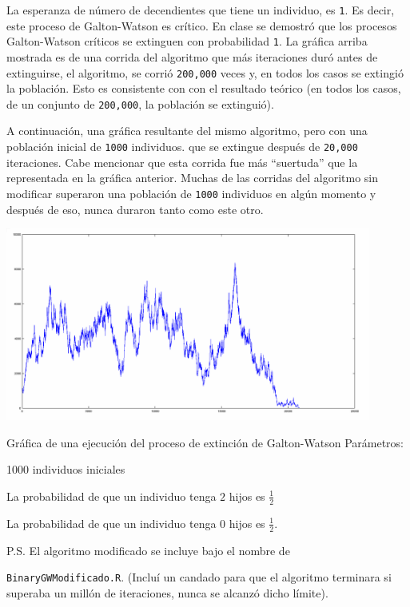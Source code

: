 La esperanza de número de decendientes que tiene un individuo, es \texttt{1}. Es decir,
este proceso de Galton-Watson es crítico. En clase se demostró que los procesos Galton-Watson
críticos se extinguen con probabilidad \texttt{1}. La gráfica arriba mostrada es de una corrida
del algoritmo que más iteraciones duró antes de extinguirse, el algoritmo, se corrió
\texttt{200,000} veces y, en todos los casos se extingió la población. Esto es consistente con
con el resultado teórico (en todos los casos, de un conjunto de \texttt{200,000}, la población se extinguió).\pn

A continuación, una gráfica resultante del mismo algoritmo, pero con una población inicial de \texttt{1000} individuos.
que se extingue después de \texttt{20,000} iteraciones. Cabe mencionar que esta corrida fue más ``suertuda'' que la
representada en la gráfica anterior. Muchas de las corridas del algoritmo sin modificar superaron una población de
\texttt{1000} individuos en algún momento y después de eso, nunca duraron tanto como este otro.

\begin{center}
    \includegraphics[width=12cm]{tarea3/problema3_4/galtonWatsonEmpezandoEn1000.PNG}
    
    Gr\'afica de una ejecuci\'on del proceso de extinci\'on de Galton-Watson 
    Par\'ametros:\par 
    1000 individuos iniciales \par
    La probabilidad de que un individuo tenga $2$ hijos es $\frac{1}{2}$ \par
    La probabilidad de que un individuo tenga $0$ hijos es $\frac{1}{2}$.\pn
\end{center}

P.S. El algoritmo modificado se incluye bajo el nombre de \par
\texttt{BinaryGWModificado.R}. (Incluí un candado para que el algoritmo terminara si 
superaba un millón de iteraciones, nunca se alcanzó dicho límite).